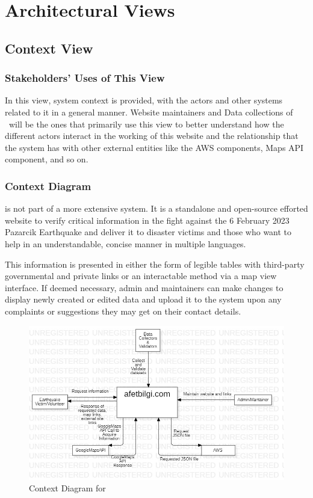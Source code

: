 \section{Architectural Views}

\subsection{Context View}

\subsubsection{Stakeholders' Uses of This View}

In this view, system context is provided, with the actors and other systems related to it in a general manner. Website maintainers and Data collections of \afetbilgi\ will be the ones that primarily use this view to better understand how the different actors interact in the working of this website and the relationship that the system has with other external entities like the AWS components, Maps API component, and so on.

\subsubsection{Context Diagram}

\afetbilgi \cite{afetbilgi} is not part of a more extensive system. It is a standalone and open-source efforted website to verify critical information in the fight against the 6 February 2023 Pazarcik Earthquake and deliver it to disaster victims and those who want to help in an understandable, concise manner in multiple languages.

This information is presented in either the form of legible tables with third-party governmental and private links or an interactable method via a map view interface. If deemed necessary, admin and maintainers can make changes to display newly created or edited data and upload it to the system upon any complaints or suggestions they may get on their contact details.

\begin{figure}[H]
  \centering
  \includegraphics[width=\linewidth]{img/context-diagram.jpg}
  \caption{Context Diagram for \afetbilgi}
\end{figure}

